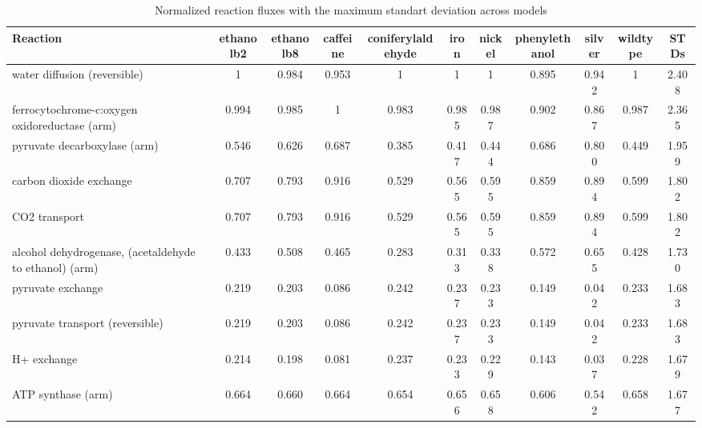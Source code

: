 \begin{longtable}{|l|c|c|c|c|c|c|c|c|c|c|}
    \caption[Common upregulated and downregulated genes]{Normalized reaction fluxes with the maximum standart deviation across models}
\hline
Reaction                                                   & ethanolb2 & ethanolb8 & caffeine & coniferylaldehyde & iron  & nickel & phenylethanol & silver & wildtype & STDs  \\ \hline
\endhead
%
water diffusion (reversible)                               & 1         & 0.984     & 0.953    & 1                 & 1     & 1      & 0.895         & 0.942  & 1        & 2.408 \\ \hline
ferrocytochrome-c:oxygen oxidoreductase (arm)              & 0.994     & 0.985     & 1        & 0.983             & 0.985 & 0.987  & 0.902         & 0.867  & 0.987    & 2.365 \\ \hline
pyruvate decarboxylase (arm)                               & 0.546     & 0.626     & 0.687    & 0.385             & 0.417 & 0.444  & 0.686         & 0.800  & 0.449    & 1.959 \\ \hline
carbon dioxide exchange                                    & 0.707     & 0.793     & 0.916    & 0.529             & 0.565 & 0.595  & 0.859         & 0.894  & 0.599    & 1.802 \\ \hline
CO2 transport                                              & 0.707     & 0.793     & 0.916    & 0.529             & 0.565 & 0.595  & 0.859         & 0.894  & 0.599    & 1.802 \\ \hline
alcohol dehydrogenase, (acetaldehyde to ethanol) (arm)     & 0.433     & 0.508     & 0.465    & 0.283             & 0.313 & 0.338  & 0.572         & 0.655  & 0.428    & 1.730 \\ \hline
pyruvate exchange                                          & 0.219     & 0.203     & 0.086    & 0.242             & 0.237 & 0.233  & 0.149         & 0.042  & 0.233    & 1.683 \\ \hline
pyruvate transport (reversible)                            & 0.219     & 0.203     & 0.086    & 0.242             & 0.237 & 0.233  & 0.149         & 0.042  & 0.233    & 1.683 \\ \hline
H+ exchange                                                & 0.214     & 0.198     & 0.081    & 0.237             & 0.233 & 0.229  & 0.143         & 0.037  & 0.228    & 1.679 \\ \hline
ATP synthase (arm)                                         & 0.664     & 0.660     & 0.664    & 0.654             & 0.656 & 0.658  & 0.606         & 0.542  & 0.658    & 1.677 \\ \hline

\end{longtable}

